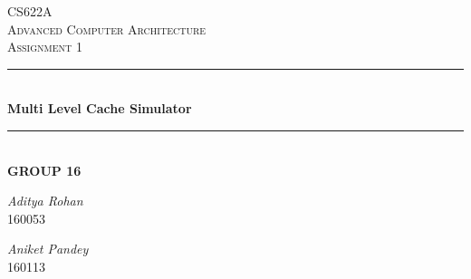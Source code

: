 \documentclass[12pt]{article}
\begin{document}
\begin{titlepage}
\newcommand{\HRule}{\rule{\linewidth}{0.1mm}} 
\center %
 
\textsc{\Large CS622A}\\[0.4cm] %
\textsc{\Large Advanced Computer Architecture}\\[0.4cm] %
\textsc{\large Assignment 1 }\\[0.4cm] %

\HRule \\[0.4cm]
{ \huge \bfseries Multi Level Cache Simulator}\\[0.1cm] %
\HRule \\[0.5cm]
{ \large \bfseries GROUP 16}\\[1cm]
 

\begin{minipage}{0.4\textwidth}
\begin{flushleft} \large

\emph{Aditya Rohan}\\160053  %
\end{flushleft}
\begin{flushleft} \large

\emph{Aniket Pandey}\\160113  %
\end{flushleft}



\end{minipage}
\end{titlepage}
\end{document}

